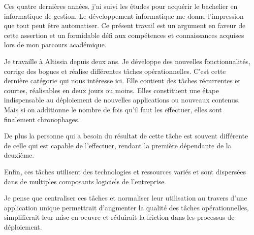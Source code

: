 Ces quatre dernières années, j'ai suivi les études pour acquérir le bachelier en informatique de gestion.
Le développement informatique me donne l'impression que tout peut être automatiser.
Ce présent travail est un argument en faveur de cette assertion et un formidable défi aux compétences et connaissances acquises lors de mon parcours académique.

Je travaille à Altissia depuis deux ans.
Je développe des nouvelles fonctionnalités, corrige des bogues et réalise différentes tâches opérationnelles.
C'est cette dernière catégorie qui nous intéresse ici.
Elle contient des tâches récurrentes et courtes, réalisables en deux jours ou moins.
Elles constituent une étape indispensable au déploiement de nouvelles applications ou nouveaux contenus.
Mais si on additionne le nombre de fois qu'il faut les effectuer, elles sont finalement chronophages.

De plus la personne qui a besoin du résultat de cette tâche est souvent différente de celle qui est capable de l'effectuer, rendant la première dépendante de la deuxième.

Enfin, ces tâches utilisent des technologies et ressources variés et sont dispersées dans de multiples composants logiciels de l'entreprise.

Je pense que centraliser ces tâches et normaliser leur utilisation au travers d'une application unique permettrait d'augmenter la qualité des tâches opérationnelles, simplifierait leur mise en oeuvre et réduirait la friction dans les processus de déploiement.
